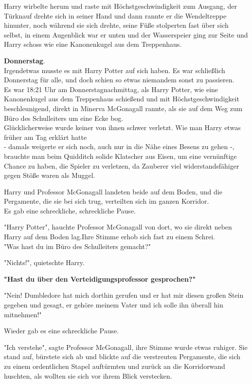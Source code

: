 {Harry wirbelte herum und raste mit Höchstgeschwindigkeit zum Ausgang, der Türknauf drehte sich in seiner Hand und dann rannte er die Wendeltreppe hinunter, noch während sie sich drehte, seine Füße stolperten fast über sich selbst, in einem Augenblick war er unten und der Wasserspeier ging zur Seite und Harry schoss wie eine Kanonenkugel aus dem Treppenhaus.

\textbf{Donnerstag}.\\ Irgendetwas musste es mit Harry Potter auf sich haben. Es war schließlich Donnerstag für alle, und doch schien so etwas niemandem sonst zu passieren.\\ Es war 18:21 Uhr am Donnerstagnachmittag, als Harry Potter, wie eine Kanonenkugel aus dem Treppenhaus schießend und mit Höchstgeschwindigkeit beschleunigend, direkt in Minerva McGonagall rannte, als sie auf dem Weg zum Büro des Schulleiters um eine Ecke bog.\\ Glücklicherweise wurde keiner von ihnen schwer verletzt. Wie man Harry etwas früher am Tag erklärt hatte\\ - damals weigerte er sich noch, auch nur in die Nähe eines Besens zu gehen -,\\ brauchte man beim Quidditch solide Klatscher aus Eisen, um eine vernünftige Chance zu haben, die Spieler zu verletzen, da Zauberer viel widerstandsfähiger gegen Stöße waren als Muggel.

Harry und Professor McGonagall landeten beide auf dem Boden, und die Pergamente, die sie bei sich trug, verteilten sich im ganzen Korridor.\\ Es gab eine schreckliche, schreckliche Pause.

"Harry Potter", hauchte Professor McGonagall von dort, wo sie direkt neben Harry auf dem Boden lag.Ihre Stimme erhob sich fast zu einem Schrei.\\ "Was hast du im Büro des Schulleiters gemacht?"

"Nichts!", quietschte Harry.

\textbf{"Hast du über den Verteidigungsprofessor gesprochen?"}

"Nein! Dumbledore hat mich dorthin gerufen und er hat mir diesen großen Stein gegeben und gesagt, er gehöre meinem Vater und ich solle ihn überall hin mitnehmen!"

Wieder gab es eine schreckliche Pause.

"Ich verstehe", sagte Professor McGonagall, ihre Stimme wurde etwas ruhiger. Sie stand auf, bürstete sich ab und blickte auf die verstreuten Pergamente, die sich zu einem ordentlichen Stapel auftürmten und zurück an die Korridorwand huschten, als wollten sie sich vor ihrem Blick verstecken.

}
